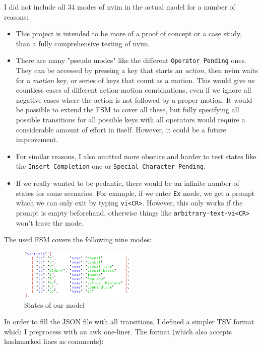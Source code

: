\documentclass[12pt]{article}
\begin{document}
		I did not include all 34 modes of nvim in the actual model for a number of reasons:
		\begin{itemize}
			\item{This project is intended to be more of a proof of concept or a case study, than a fully comprehensive testing of nvim.}
			\item{There are many "pseudo modes" like the different \verb|Operator Pending| ones. They can be accessed by pressing a key that starts an \textit{action}, then nvim waits for a \textit{motion} key, or series of keys that count as a motion. This would give us countless cases of different action-motion combinations, even if we ignore all negative cases where the action is not followed by a proper motion. It would be possible to extend the FSM to cover all these, but fully specifying all possible transitions for all possible keys with all operators would require a considerable amount of effort in itself. However, it could be a future improvement.}
			\item{For similar reasons, I also omitted more obscure and harder to test states like the \verb|Insert Completion| one or \verb|Special Character Pending|.}
			\item{If we really wanted to be pedantic, there would be an infinite number of states for some scenarios. For example, if we enter \verb|Ex| mode, we get a prompt which we can only exit by typing \verb|vi<CR>|. However, this only works if the prompt is empty beforehand, otherwise things like \verb|arbitrary-text-vi<CR>| won't leave the mode.}
		\end{itemize}

		The used FSM covers the following nine modes:

		\begin{figure}[h]
			\centering
			\includegraphics[width=0.5\textwidth]{images/vertices.png}
			\caption{States of our model}
		\end{figure}

		In order to fill the JSON file with all transitions, I defined a simpler TSV format which I preprocess with an awk one-liner. The format (which also accepts hashmarked lines as comments):\\
\end{document}
